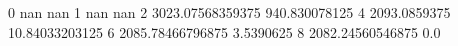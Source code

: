 0 nan nan
1 nan nan
2 3023.07568359375 940.830078125
4 2093.0859375 10.84033203125
6 2085.78466796875 3.5390625
8 2082.24560546875 0.0
